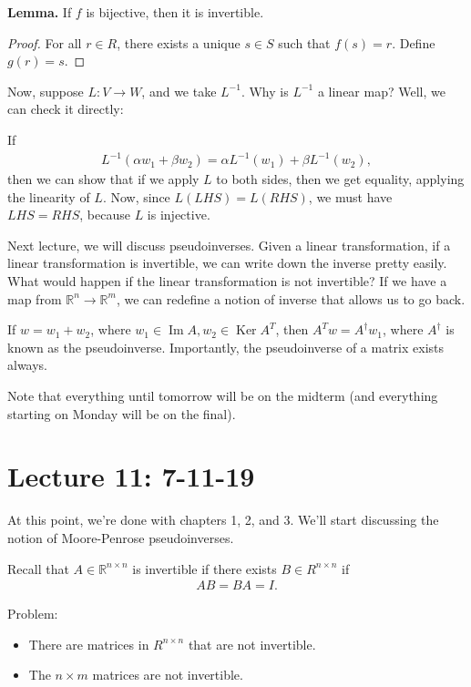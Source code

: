 \documentclass{article}
\newcommand{\RR}{\mathbb{R}}
\DeclareMathOperator{\Ker}{Ker}
\DeclareMathOperator{\Ima}{Im}
\DeclareMathOperator{\Ima}{Im}
\begin{document}
{\bf Lemma.} If $f$ is bijective, then it is invertible.

\begin{proof}
  For all $r \in R$, there exists a unique $s \in S$ such that $f(s) = r$.  Define $g(r) = s$.
\end{proof}

Now, suppose $L: V \to W$, and we take $L^{-1}$.  Why is $L^{-1}$ a linear map?  Well, we can check it directly:

If
\begin{align*}
  L^{-1} (\alpha w_1 + \beta w_2) = \alpha L^{-1} (w_1) + \beta L^{-1} (w_2),
\end{align*}
then we can show that if we apply $L$ to both sides, then we get equality, applying the linearity of $L$.  Now, since $L(LHS) = L(RHS)$, we must have $LHS = RHS$, because $L$ is injective.

Next lecture, we will discuss pseudoinverses.  Given a linear transformation, if a linear transformation is invertible, we can write down the inverse pretty easily.  What would happen if the linear transformation is not invertible?  If we have a map from $\RR^n \to \RR^m$, we can redefine a notion of inverse that allows us to go back.

If $w = w_1 + w_2$, where $w_1 \in \Ima A, w_2 \in \Ker A^T$, then $A^T w = A^{\dagger} w_1$, where $A^{\dagger}$ is known as the pseudoinverse.  Importantly, the pseudoinverse of a matrix exists always.

Note that everything until tomorrow will be on the midterm (and everything starting on Monday will be on the final).

\section{Lecture 11: 7-11-19}

At this point, we're done with chapters 1, 2, and 3.  We'll start discussing the notion of Moore-Penrose pseudoinverses.

Recall that $A \in \RR^{n \times n}$ is invertible if there exists $B \in R^{n \times n}$ if
\begin{align*}
  AB = BA = I.
\end{align*}

Problem:
\begin{itemize}
  \item There are matrices in $R^{n \times n}$ that are not invertible.
  \item The $n \times m$ matrices are not invertible.
\end{itemize}
\end{document}
